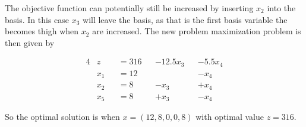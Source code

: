 The objective function can potentially still be increased by inserting $x_2$ into the basis. In this case $x_3$ will leave the basis, as that is the first basis variable the becomes thigh when $x_2$ are increased. The new problem maximization problem is then given by

\begin{alignat*}{4}
&z     &&=  316  && - 12.5 x_3 &&   -5.5x_4    \\
&x_1   &&= 12    &&            &&     -x_4       \\
&x_2   &&= 8     &&       -x_3 &&     +x_4       \\
&x_5   &&= 8    &&        +x_3 &&     -x_4
\end{alignat*}

So the optimal solution is when $x=(12,8,0,0,8)$ with optimal value $z=316$.